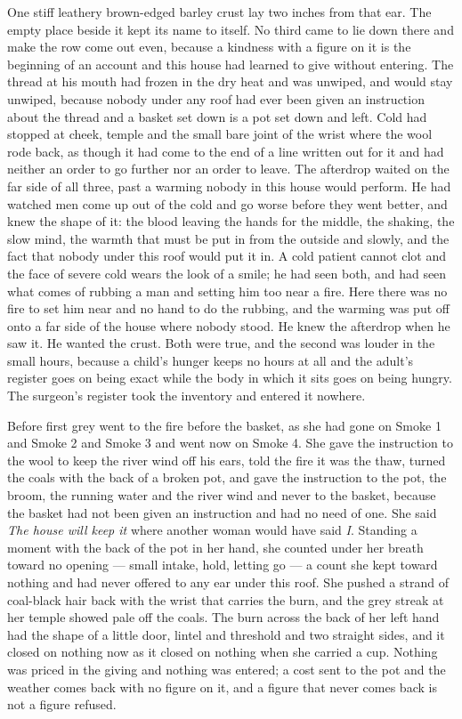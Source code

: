 One stiff leathery brown-edged barley crust lay two inches from that ear. The empty place beside it kept its name to itself. No third came to lie down there and make the row come out even, because a kindness with a figure on it is the beginning of an account and this house had learned to give without entering. The thread at his mouth had frozen in the dry heat and was unwiped, and would stay unwiped, because nobody under any roof had ever been given an instruction about the thread and a basket set down is a pot set down and left. Cold had stopped at cheek, temple and the small bare joint of the wrist where the wool rode back, as though it had come to the end of a line written out for it and had neither an order to go further nor an order to leave. The afterdrop waited on the far side of all three, past a warming nobody in this house would perform. He had watched men come up out of the cold and go worse before they went better, and knew the shape of it: the blood leaving the hands for the middle, the shaking, the slow mind, the warmth that must be put in from the outside and slowly, and the fact that nobody under this roof would put it in. A cold patient cannot clot and the face of severe cold wears the look of a smile; he had seen both, and had seen what comes of rubbing a man and setting him too near a fire. Here there was no fire to set him near and no hand to do the rubbing, and the warming was put off onto a far side of the house where nobody stood. He knew the afterdrop when he saw it. He wanted the crust. Both were true, and the second was louder in the small hours, because a child's hunger keeps no hours at all and the adult's register goes on being exact while the body in which it sits goes on being hungry. The surgeon's register took the inventory and entered it nowhere.

\scenebreak

Before first grey  went to the fire before the basket, as she had gone on Smoke 1 and Smoke 2 and Smoke 3 and went now on Smoke 4. She gave the instruction to the wool to keep the river wind off his ears, told the fire it was the thaw, turned the coals with the back of a broken pot, and gave the instruction to the pot, the broom, the running water and the river wind and never to the basket, because the basket had not been given an instruction and had no need of one. She said \emph{The house will keep it} where another woman would have said \emph{I}. Standing a moment with the back of the pot in her hand, she counted under her breath toward no opening --- small intake, hold, letting go --- a count she kept toward nothing and had never offered to any ear under this roof. She pushed a strand of coal-black hair back with the wrist that carries the burn, and the grey streak at her temple showed pale off the coals. The burn across the back of her left hand had the shape of a little door, lintel and threshold and two straight sides, and it closed on nothing now as it closed on nothing when she carried a cup. Nothing was priced in the giving and nothing was entered; a cost sent to the pot and the weather comes back with no figure on it, and a figure that never comes back is not a figure refused.

